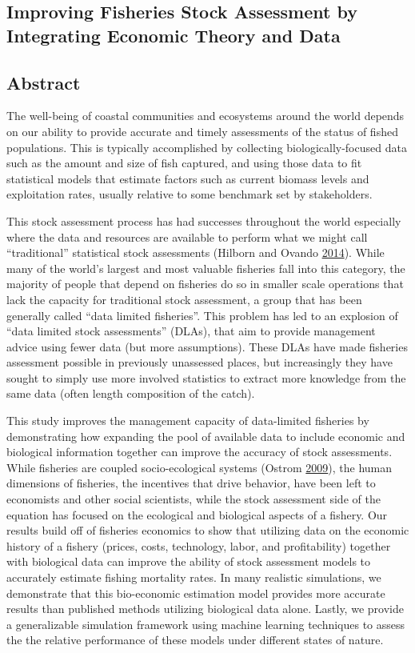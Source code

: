 \documentclass[twoside,12pt,final]{ucthesis-CA2012}
\begin{document}
\begin{ucmainmatter}
\chapter{Improving Fisheries Stock Assessment by Integrating Economic
Theory and Data}\label{scrooge}

\section{Abstract}\label{abstract}

The well-being of coastal communities and ecosystems around the world
depends on our ability to provide accurate and timely assessments of the
status of fished populations. This is typically accomplished by
collecting biologically-focused data such as the amount and size of fish
captured, and using those data to fit statistical models that estimate
factors such as current biomass levels and exploitation rates, usually
relative to some benchmark set by stakeholders.

This stock assessment process has had successes throughout the world
especially where the data and resources are available to perform what we
might call ``traditional'' statistical stock assessments (Hilborn and
Ovando \protect\hyperlink{ref-Hilborn2014b}{2014}). While many of the
world's largest and most valuable fisheries fall into this category, the
majority of people that depend on fisheries do so in smaller scale
operations that lack the capacity for traditional stock assessment, a
group that has been generally called ``data limited fisheries''. This
problem has led to an explosion of ``data limited stock assessments''
(DLAs), that aim to provide management advice using fewer data (but more
assumptions). These DLAs have made fisheries assessment possible in
previously unassessed places, but increasingly they have sought to
simply use more involved statistics to extract more knowledge from the
same data (often length composition of the catch).

This study improves the management capacity of data-limited fisheries by
demonstrating how expanding the pool of available data to include
economic and biological information together can improve the accuracy of
stock assessments. While fisheries are coupled socio-ecological systems
(Ostrom \protect\hyperlink{ref-Ostrom2009}{2009}), the human dimensions
of fisheries, the incentives that drive behavior, have been left to
economists and other social scientists, while the stock assessment side
of the equation has focused on the ecological and biological aspects of
a fishery. Our results build off of fisheries economics to show that
utilizing data on the economic history of a fishery (prices, costs,
technology, labor, and profitability) together with biological data can
improve the ability of stock assessment models to accurately estimate
fishing mortality rates. In many realistic simulations, we demonstrate
that this bio-economic estimation model provides more accurate results
than published methods utilizing biological data alone. Lastly, we
provide a generalizable simulation framework using machine learning
techniques to assess the the relative performance of these models under
different states of nature.


\end{ucmainmatter}
\end{document}
